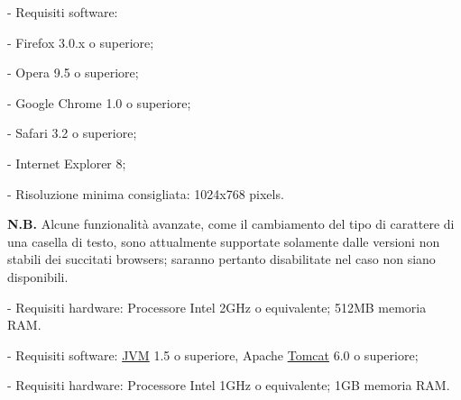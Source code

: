 \begin{elencopuntato}[\normindent]
    \item[-] Requisiti software: 
\begin{elencopuntato}[\normindent]
 \item[-]   Firefox 3.0.x o superiore;
 \item[-]   Opera 9.5 o superiore; 
 \item[-]   Google Chrome 1.0 o superiore; 
 \item[-]   Safari 3.2 o superiore; 
 \item[-]   Internet Explorer 8;
 \item[-]   Risoluzione minima consigliata: 1024x768 pixels.
\end{elencopuntato}
\textbf{N.B.} Alcune funzionalit\`a avanzate, come il cambiamento del tipo di carattere di una casella di testo, sono attualmente supportate solamente dalle versioni non stabili dei succitati browsers; saranno pertanto disabilitate nel caso non siano disponibili.
    \item[-] Requisiti hardware: Processore Intel 2GHz o equivalente; 512MB memoria RAM.

\end{elencopuntato}
\begin{elencopuntato}[\normindent]
    \item[-] Requisiti software: \underline{JVM} 1.5 o superiore, Apache \underline{Tomcat} 6.0 o superiore;
    \item[-] Requisiti hardware: Processore Intel 1GHz o equivalente; 1GB memoria RAM.
\end{elencopuntato}
 
 

